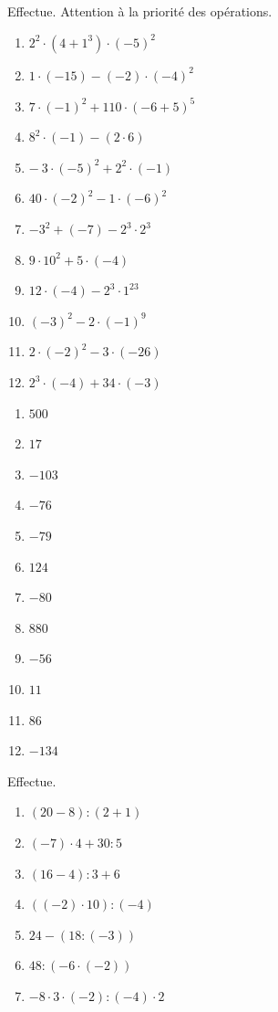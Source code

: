 \documentclass[../../syllabus_1.tex]{subfiles}
\begin{document}
\begin{exercise}
    Effectue. Attention à la priorité des opérations.
    \begin{enumerate}[itemsep=.4cm, cols=3]
        \item \(2^{2} \cdot (4 + 1^{3}) \cdot ( - 5)^{2} \)
        \item \(1 \cdot ( - 15) - ( - 2) \cdot ( - 4)^{2} \)
        \item \(7 \cdot ( - 1)^{2} + 110 \cdot ( - 6 + 5)^{5} \)
        \item \(8^{2} \cdot ( - 1) - (2 \cdot 6) \)
        \item \(- \ 3 \cdot ( - 5)^{2} + 2^{2} \cdot ( - 1) \)
        \item \(40 \cdot ( - 2)^{2} - 1 \cdot ( - 6)^{2} \)
        \item \(- 3^{2} + ( - 7) - 2^{3} \cdot 2^{3} \)
        \item \(9 \cdot 10^{2} + 5 \cdot ( - 4) \)
        \item \(12 \cdot ( - 4) - 2^{3} \cdot 1^{23} \)
        \item \(( - 3)^{2} - 2 \cdot ( - 1)^{9} \)
        \item \(2 \cdot ( - 2)^{2} - 3 \cdot ( - 26) \)
        \item \(2^{3} \cdot ( - 4) + 34 \cdot ( - 3) \)
    \end{enumerate}
\end{exercise}
\begin{solution}
    \begin{enumerate}[cols=4]
        \item \(500\)
        \item \(17\)
        \item \(-103\)
        \item \(-76\)
        \item \(-79\)
        \item \(124\)
        \item \(-80\)
        \item \(880\)
        \item \(-56\)
        \item \(11\)
        \item \(86\)
        \item \(-134\)
    \end{enumerate}
\end{solution}

\newpage
\begin{exercise}
    Effectue.
       \begin{enumerate}[itemsep=.3cm , cols=3]
        \item \((20 - 8) : (2 + 1) \)
        \item \((-7) \cdot 4 + 30 : 5 \)
        \item \((16 - 4) : 3 + 6 \)
        \item \(((-2) \cdot 10) : (-4) \)
        \item \(24 - (18 : (-3)) \)
        \item \(48 : (-6 \cdot (-2)) \)
        \item \(-8 \cdot 3 \cdot (-2) : (-4) \cdot 2 \)
    \end{enumerate}
\end{exercise}
\end{document}
